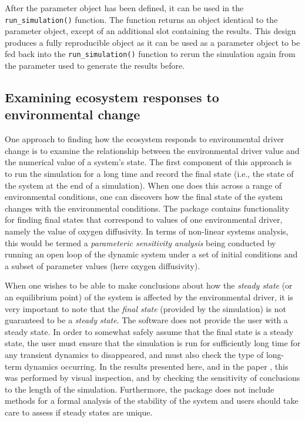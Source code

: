 \documentclass[]{elsarticle} %
\begin{document}
After the parameter object has been defined, it can be used in the \texttt{run\_simulation()} function. The function returns an object identical to the parameter object, except of an additional slot containing the results. This design produces a fully reproducible object as it can be used as a parameter object to be fed back into the \texttt{run\_simulation()} function to rerun the simulation again from the parameter used to generate the results before.

\subsection{Examining ecosystem responses to environmental change}\label{examining-ecosystem-responses-to-environmental-change}

One approach to finding how the ecosystem responds to environmental driver change is to examine the relationship between the environmental driver value and the numerical value of a system's state. The first component of this approach is to run the simulation for a long time and record the final state (i.e., the state of the system at the end of a simulation). When one does this across a range of environmental conditions, one can discovers how the final state of the system changes with the environmental conditions. The package contains functionality for finding final states that correspond to values of one environmental driver, namely the value of oxygen diffusivity. In terms of non-linear systems analysis, this would be termed a \emph{parameteric sensitivity analysis} being conducted by running an open loop of the dynamic system under a set of initial conditions and a subset of parameter values (here oxygen diffusivity).

When one wishes to be able to make conclusions about how the \emph{steady state} (or an equilibrium point) of the system is affected by the environmental driver, it is very important to note that the \emph{final state} (provided by the simulation) is not guaranteed to be a \emph{steady state}. The software does not provide the user with a steady state. In order to somewhat safely assume that the final state is a steady state, the user must ensure that the simulation is run for sufficiently long time for any transient dynamics to disappeared, and must also check the type of long-term dynamics occurring. In the results presented here, and in the paper \citet{Limberger2023}, this was performed by visual inspection, and by checking the sensitivity of conclusions to the length of the simulation. Furthermore, the package does not include methods for a formal analysis of the stability of the system and users should take care to assess if steady states are unique.
\end{document}

